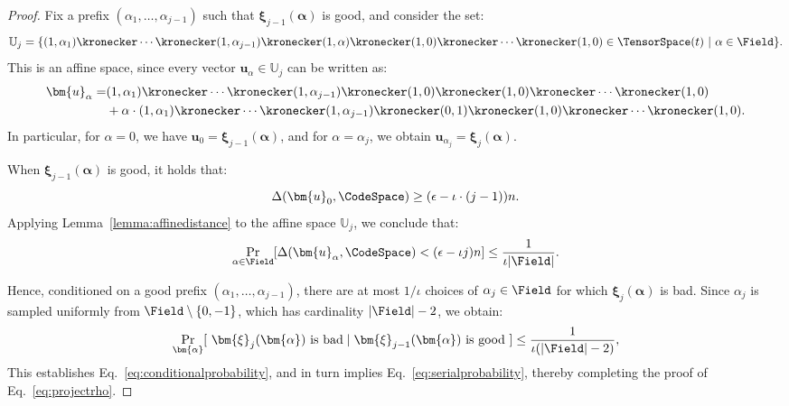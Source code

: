 \begin{proof}
Fix a prefix $(\alpha_1, \ldots, \alpha_{j-1})$ such that $\bm{\xi}_{j-1}(\bm{\alpha})$ is good, and consider the set:
\[
    \mathbb{U}_j =
    \{ (1,\alpha_1) \kronecker \cdots \kronecker (1, \alpha_{j-1})
    \kronecker
    (1,\alpha) \kronecker (1,0) \kronecker \cdots \kronecker (1,0) \in \TensorSpace(t) ~|~ \alpha \in \Field \}.
\]
This is an affine space, since every vector $\bm{u}_\alpha \in \mathbb{U}_j$ can be written as:
\begin{align*}
\bm{u}_\alpha
=&
    (1,\alpha_1) \kronecker \cdots \kronecker (1, \alpha_{j-1})
    \kronecker
    (1,0) \kronecker (1,0) \kronecker \cdots \kronecker (1,0) 
\\
&
    + \alpha \cdot (1,\alpha_1) \kronecker \cdots \kronecker (1, \alpha_{j-1})
    \kronecker
    (0,1) \kronecker (1,0) \kronecker \cdots \kronecker (1,0).
\end{align*}
In particular, for $\alpha = 0$, we have $\bm{u}_0 = \bm{\xi}_{j-1}(\bm{\alpha})$, and for $\alpha = \alpha_j$, we obtain $\bm{u}_{\alpha_j} = \bm{\xi}_j(\bm{\alpha})$.

When $\bm{\xi}_{j-1}(\bm{\alpha})$ is good,
it holds that:
\[
    \Delta(\bm{u}_0,\CodeSpace) \ge (\epsilon - \iota \cdot (j-1))n.
\]
Applying Lemma~\ref{lemma:affinedistance} to the affine space $\mathbb{U}_j$, we conclude that:
\[
    \Pr_{\alpha \in \Field}[\Delta(\bm{u}_\alpha, \CodeSpace) < (\epsilon- \iota j)n] \le \frac{1}{\iota|\Field|}.
\]

Hence, conditioned on a good prefix $(\alpha_1, \ldots, \alpha_{j-1})$, there are at most $1/\iota$ choices of $\alpha_j \in \Field$ for which $\bm{\xi}_j(\bm{\alpha})$ is bad. Since $\alpha_j$ is sampled uniformly from $\Field \setminus \{0, -1\}$, which has cardinality $|\Field| - 2$, we obtain:
\[
    \Pr_{\bm{\alpha}}[~\bm{\xi}_{j}(\bm{\alpha}) \text{ is bad} \mid \bm{\xi}_{j-1}(\bm{\alpha}) \text{ is good} ~]
    \le \frac{1}{\iota (|\Field|-2)},
\]
This establishes Eq.~\eqref{eq:conditionalprobability}, and in turn implies Eq.~\eqref{eq:serialprobability}, thereby completing the proof of Eq.~\eqref{eq:projectrho}.
\end{proof}
